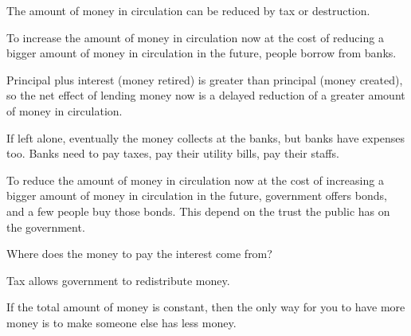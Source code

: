 The amount of money in circulation can be reduced by tax or destruction.

To increase the amount of money in circulation now
at the cost of reducing a bigger amount of money in circulation in the future,
people borrow from banks.

Principal plus interest (money retired) is greater than principal (money created),
so the net effect of lending money now
is a delayed reduction of a greater amount of money in circulation.

If left alone, eventually the money collects at the banks,
but banks have expenses too.
Banks need to pay taxes, pay their utility bills,
pay their staffs.

To reduce the amount of money in circulation now
at the cost of increasing a bigger amount of money in circulation in the future,
government offers bonds, and a few people buy those bonds.
This depend on the trust the public has on the government.

Where does the money to pay the interest come from?

Tax allows government to redistribute money.

If the total amount of money is constant,
then the only way for you to have more money
is to make someone else has less money.
